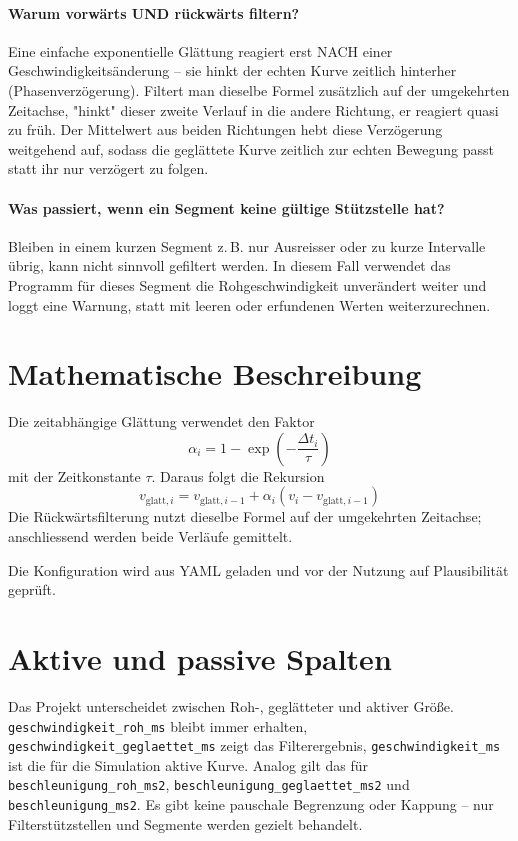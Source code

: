 \paragraph{Warum vorwärts UND rückwärts filtern?} Eine einfache exponentielle Glättung reagiert erst NACH einer Geschwindigkeitsänderung -- sie hinkt der echten Kurve zeitlich hinterher (Phasenverzögerung). Filtert man dieselbe Formel zusätzlich auf der umgekehrten Zeitachse, "hinkt" dieser zweite Verlauf in die andere Richtung, er reagiert quasi zu früh. Der Mittelwert aus beiden Richtungen hebt diese Verzögerung weitgehend auf, sodass die geglättete Kurve zeitlich zur echten Bewegung passt statt ihr nur verzögert zu folgen.

\paragraph{Was passiert, wenn ein Segment keine gültige Stützstelle hat?} Bleiben in einem kurzen Segment z.\,B. nur Ausreisser oder zu kurze Intervalle übrig, kann nicht sinnvoll gefiltert werden. In diesem Fall verwendet das Programm für dieses Segment die Rohgeschwindigkeit unverändert weiter und loggt eine Warnung, statt mit leeren oder erfundenen Werten weiterzurechnen.

\section{Mathematische Beschreibung}

Die zeitabhängige Glättung verwendet den Faktor
\begin{equation}
\alpha_i = 1 - \exp\left(-\frac{\Delta t_i}{\tau}\right)
\end{equation}
mit der Zeitkonstante \(\tau\). Daraus folgt die Rekursion
\begin{equation}
 v_{\mathrm{glatt},i}
 = v_{\mathrm{glatt},i-1}
 + \alpha_i\left(v_i - v_{\mathrm{glatt},i-1}\right)
\end{equation}
Die Rückwärtsfilterung nutzt dieselbe Formel auf der umgekehrten Zeitachse; anschliessend werden beide Verläufe gemittelt.

Die Konfiguration wird aus YAML geladen \cite{pyyaml_docs} und vor der Nutzung auf Plausibilität geprüft.

\section{Aktive und passive Spalten}

Das Projekt unterscheidet zwischen Roh-, geglätteter und aktiver Größe. \texttt{geschwindigkeit\_roh\_ms} bleibt immer erhalten, \texttt{geschwindigkeit\_geglaettet\_ms} zeigt das Filterergebnis, \texttt{geschwindigkeit\_ms} ist die für die Simulation aktive Kurve. Analog gilt das für \texttt{beschleunigung\_roh\_ms2}, \texttt{beschleunigung\_geglaettet\_ms2} und \texttt{beschleunigung\_ms2}. Es gibt keine pauschale Begrenzung oder Kappung -- nur Filterstützstellen und Segmente werden gezielt behandelt.
